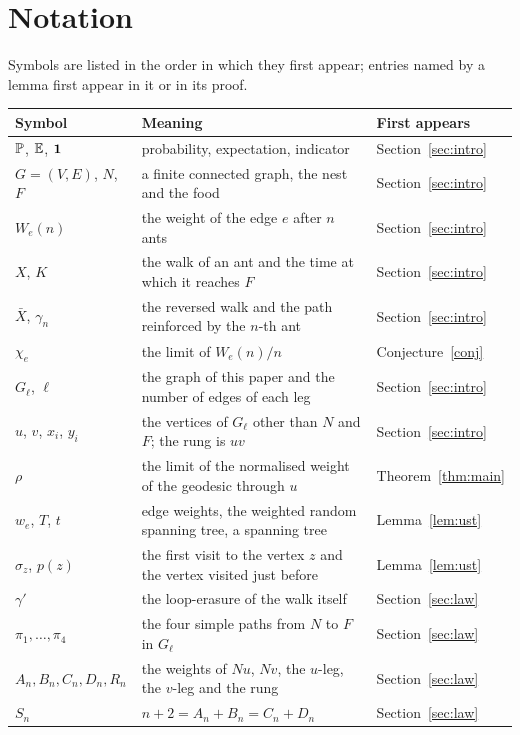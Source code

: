 \section{Notation}\label{app:notation}
Symbols are listed in the order in which they first appear; entries named by a lemma first appear in it or in its
proof.

\medskip
\begin{center}
\small
\begin{tabular}{@{}lp{}l@{}}
\toprule
Symbol & Meaning & First appears\\
\midrule
$\mathbb{P}$, $\mathbb{E}$, $\mathbf{1}$ & probability, expectation, indicator & Section~\ref{sec:intro}\\
$G=(V,E)$, $N$, $F$ & a finite connected graph, the nest and the food & Section~\ref{sec:intro}\\
$W_e(n)$ & the weight of the edge $e$ after $n$ ants & Section~\ref{sec:intro}\\
$X$, $K$ & the walk of an ant and the time at which it reaches $F$ & Section~\ref{sec:intro}\\
$\bar X$, $\gamma_n$ & the reversed walk and the path reinforced by the $n$-th ant & Section~\ref{sec:intro}\\
$\chi_e$ & the limit of $W_e(n)/n$ & Conjecture~\ref{conj}\\
$G_\ell$, $\ell$ & the graph of this paper and the number of edges of each leg & Section~\ref{sec:intro}\\
$u$, $v$, $x_i$, $y_i$ & the vertices of $G_\ell$ other than $N$ and $F$; the rung is $uv$ & Section~\ref{sec:intro}\\
$\rho$ & the limit of the normalised weight of the geodesic through $u$ & Theorem~\ref{thm:main}\\
$w_e$, $T$, $t$ & edge weights, the weighted random spanning tree, a spanning tree & Lemma~\ref{lem:ust}\\
$\sigma_z$, $p(z)$ & the first visit to the vertex $z$ and the vertex visited just before & Lemma~\ref{lem:ust}\\
$\gamma'$ & the loop-erasure of the walk itself & Section~\ref{sec:law}\\
$\pi_1,\dots,\pi_4$ & the four simple paths from $N$ to $F$ in $G_\ell$ & Section~\ref{sec:law}\\
$A_n,B_n,C_n,D_n,R_n$ & the weights of $Nu$, $Nv$, the $u$-leg, the $v$-leg and the rung & Section~\ref{sec:law}\\
$S_n$ & $n+2=A_n+B_n=C_n+D_n$ & Section~\ref{sec:law}\\

\end{tabular}
\end{center}
